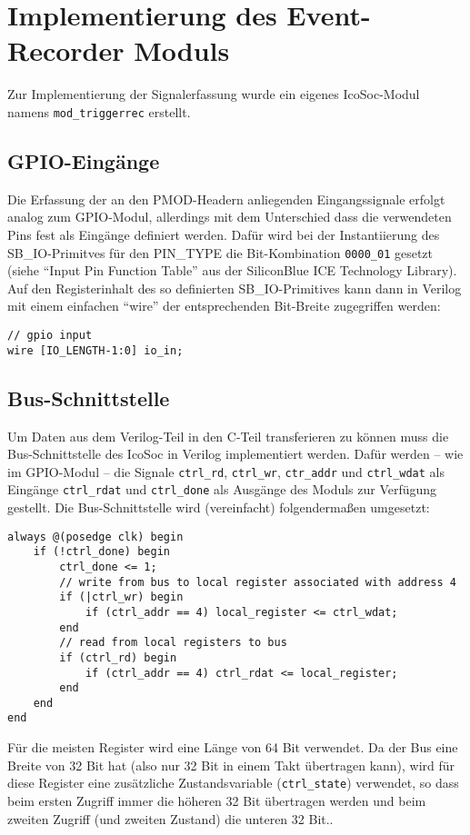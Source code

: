 {\section{Implementierung des Event-Recorder Moduls}
\label{ch:Implementierung:sec:Event-Recorder}

Zur Implementierung der Signalerfassung wurde ein eigenes IcoSoc-Modul namens {\tt mod\_triggerrec} erstellt.
\subsection{GPIO-Eingänge}
Die Erfassung der an den PMOD-Headern anliegenden Eingangssignale erfolgt analog zum GPIO-Modul, allerdings mit dem Unterschied dass die verwendeten Pins fest als Eingänge definiert werden.
Dafür wird bei der Instantiierung des SB\_IO-Primitves für den PIN\_TYPE die Bit-Kombination {\tt 0000\_01} gesetzt (siehe ``Input Pin Function Table'' aus der SiliconBlue ICE Technology Library\cite[S.~73]{doc:tec_lib}).\\ 
Auf den Registerinhalt des so definierten SB\_IO-Primitives kann dann in Verilog mit einem einfachen ``wire'' der entsprechenden Bit-Breite zugegriffen werden:
\begin{verbatim}
// gpio input
wire [IO_LENGTH-1:0] io_in;
\end{verbatim}

\subsection{Bus-Schnittstelle}
Um Daten aus dem Verilog-Teil in den C-Teil transferieren zu können muss die Bus-Schnittstelle des IcoSoc in Verilog implementiert werden.
Dafür werden -- wie im GPIO-Modul -- die Signale {\tt ctrl\_rd}, {\tt ctrl\_wr}, {\tt ctr\_addr} und {\tt ctrl\_wdat} als Eingänge {\tt ctrl\_rdat} und {\tt ctrl\_done} als Ausgänge des Moduls zur Verfügung gestellt.
Die Bus-Schnittstelle wird (vereinfacht) folgendermaßen umgesetzt:
\begin{verbatim}
always @(posedge clk) begin		
	if (!ctrl_done) begin
		ctrl_done <= 1;
		// write from bus to local register associated with address 4
		if (|ctrl_wr) begin
			if (ctrl_addr == 4) local_register <= ctrl_wdat;
		end
		// read from local registers to bus
		if (ctrl_rd) begin
			if (ctrl_addr == 4) ctrl_rdat <= local_register;
		end
	end
end
\end{verbatim}

Für die meisten Register wird eine Länge von 64 Bit verwendet. Da der Bus eine Breite von 32 Bit hat (also nur 32 Bit in einem Takt übertragen kann), wird für diese Register eine zusätzliche Zustandsvariable ({\tt ctrl\_state}) verwendet, so dass beim ersten Zugriff immer die höheren 32 Bit übertragen werden und beim zweiten Zugriff (und zweiten Zustand) die unteren 32 Bit.. 

}
